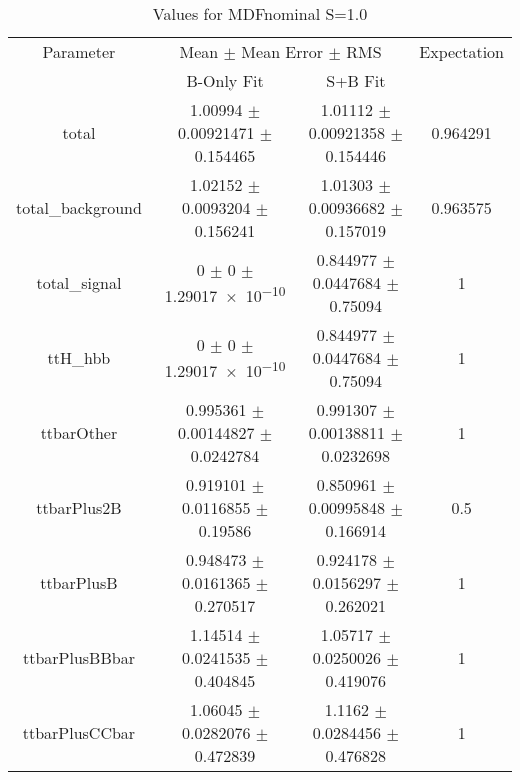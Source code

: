 \begin{table}
\centering
\caption{Values for MDFnominal S=1.0}
\begin{tabular}{cccc}
\toprule
Parameter & \multicolumn{2}{c}{Mean $\pm$ Mean Error $\pm$ RMS} & Expectation\\
 & B-Only Fit & S+B Fit & \\
\midrule
total & \num{1.00994} $\pm$ \num{0.00921471} $\pm$ \num{0.154465} & \num{1.01112} $\pm$ \num{0.00921358} $\pm$ \num{0.154446} & \num{0.964291}\\
total\_background & \num{1.02152} $\pm$ \num{0.0093204} $\pm$ \num{0.156241} & \num{1.01303} $\pm$ \num{0.00936682} $\pm$ \num{0.157019} & \num{0.963575}\\
total\_signal & \num{0} $\pm$ \num{0} $\pm$ \num{1.29017e-10} & \num{0.844977} $\pm$ \num{0.0447684} $\pm$ \num{0.75094} & \num{1}\\
ttH\_hbb & \num{0} $\pm$ \num{0} $\pm$ \num{1.29017e-10} & \num{0.844977} $\pm$ \num{0.0447684} $\pm$ \num{0.75094} & \num{1}\\
ttbarOther & \num{0.995361} $\pm$ \num{0.00144827} $\pm$ \num{0.0242784} & \num{0.991307} $\pm$ \num{0.00138811} $\pm$ \num{0.0232698} & \num{1}\\
ttbarPlus2B & \num{0.919101} $\pm$ \num{0.0116855} $\pm$ \num{0.19586} & \num{0.850961} $\pm$ \num{0.00995848} $\pm$ \num{0.166914} & \num{0.5}\\
ttbarPlusB & \num{0.948473} $\pm$ \num{0.0161365} $\pm$ \num{0.270517} & \num{0.924178} $\pm$ \num{0.0156297} $\pm$ \num{0.262021} & \num{1}\\
ttbarPlusBBbar & \num{1.14514} $\pm$ \num{0.0241535} $\pm$ \num{0.404845} & \num{1.05717} $\pm$ \num{0.0250026} $\pm$ \num{0.419076} & \num{1}\\
ttbarPlusCCbar & \num{1.06045} $\pm$ \num{0.0282076} $\pm$ \num{0.472839} & \num{1.1162} $\pm$ \num{0.0284456} $\pm$ \num{0.476828} & \num{1}\\
\bottomrule
\end{tabular}
\end{table}